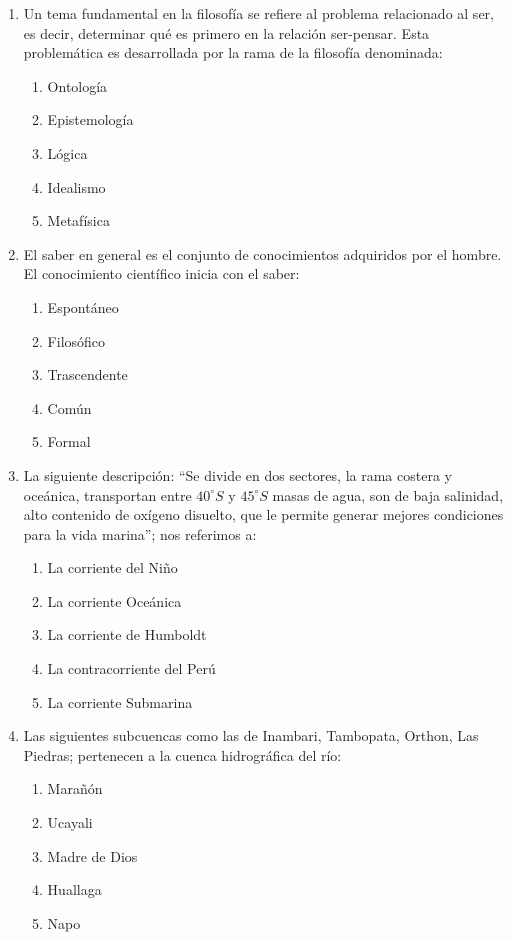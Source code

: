 \begin{enumerate}
	\item Un tema fundamental en la filosofía se refiere al problema relacionado al ser, es decir, determinar qué es primero en la relación ser-pensar. Esta problemática es desarrollada por la rama de la filosofía denominada:
	\begin{enumerate}[label=\alph*)]
		\item Ontología
		\item Epistemología
		\item Lógica
		\item Idealismo
		\item Metafísica
	\end{enumerate}
	
	\item El saber en general es el conjunto de conocimientos adquiridos por el hombre. El conocimiento científico inicia con el saber:
	\begin{enumerate}[label=\alph*)]
		\item Espontáneo
		\item Filosófico
		\item Trascendente
		\item Común
		\item Formal
	\end{enumerate}
	
	\item La siguiente descripción: “Se divide en dos sectores, la rama costera y oceánica, transportan entre $40^\circ S$ y $45^\circ S$ masas de agua, son de baja salinidad, alto contenido de oxígeno disuelto, que le permite generar mejores condiciones para la vida marina”; nos referimos a:
	\begin{enumerate}[label=\alph*)]
		\item La corriente del Niño
		\item La corriente Oceánica
		\item La corriente de Humboldt
		\item La contracorriente del Perú
		\item La corriente Submarina
	\end{enumerate}
	
	\item Las siguientes subcuencas como las de Inambari, Tambopata, Orthon, Las Piedras; pertenecen a la cuenca hidrográfica del río:
	\begin{enumerate}[label=\alph*)]
		\item Marañón
		\item Ucayali
		\item Madre de Dios
		\item Huallaga
		\item Napo
	\end{enumerate}
	

\end{enumerate}
